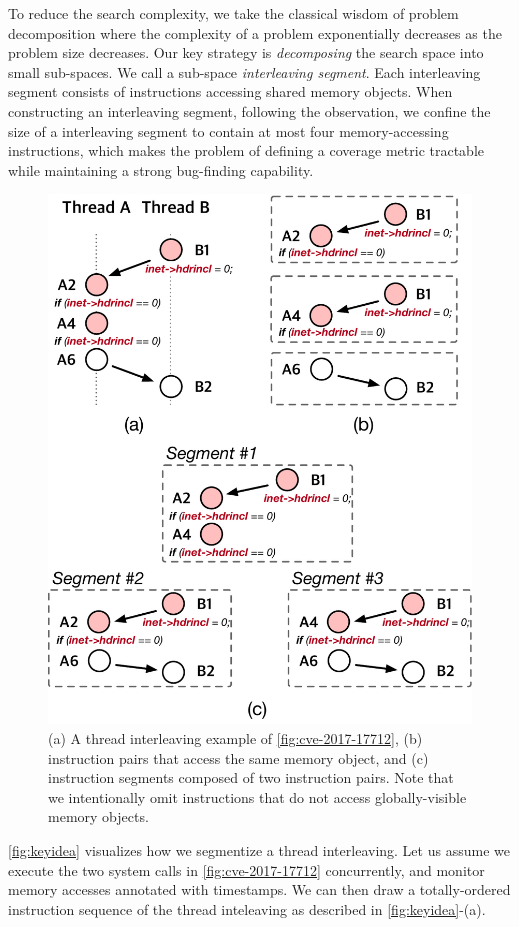 %
To reduce the search complexity, we take the classical wisdom of
problem decomposition where the complexity of a problem exponentially
decreases as the problem size decreases.
%
Our key strategy is \textit{decomposing} the search space into small
sub-spaces. We call a sub-space \textit{interleaving segment}.
%
Each interleaving segment consists of instructions accessing 
shared memory objects.
%
%
When constructing an interleaving segment, following the observation, 
we confine the size of a interleaving segment 
to contain at most four memory-accessing instructions,
which makes the problem of defining a coverage metric tractable while maintaining a strong bug-finding capability.


%
\begin{figure}[t]
  \centering
  \includegraphics[width=0.8\linewidth]{fig/intuition.pdf}
  \caption{(a) A thread interleaving example of
    \autoref{fig:cve-2017-17712}, (b) instruction pairs that access
    the same memory object, and (c) instruction segments composed of
    two instruction pairs.  Note that we intentionally omit
    instructions that do not access globally-visible memory
    objects.}
  \label{fig:keyidea}
\end{figure}
%
\autoref{fig:keyidea} visualizes how we segmentize a thread
interleaving.
%
Let us assume we execute the two system calls in
\autoref{fig:cve-2017-17712} concurrently, and monitor memory accesses
annotated with timestamps.
%
We can then draw a totally-ordered instruction sequence of the thread
inteleaving as described in \autoref{fig:keyidea}-(a).



